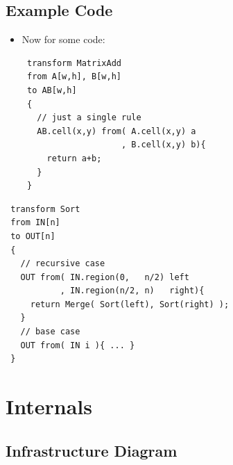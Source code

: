 \documentclass{beamer}
\begin{document}
\subsection{Example Code}

\begin{frame}[fragile]
\begin{itemize}
\item Now for some code:
{\small
\begin{verbatim}
 transform MatrixAdd
 from A[w,h], B[w,h] 
 to AB[w,h]
 {
   // just a single rule
   AB.cell(x,y) from( A.cell(x,y) a
                    , B.cell(x,y) b){
     return a+b;
   }
 }
\end{verbatim}
}
\end{itemize}
\end{frame}

\begin{frame}[fragile]
\begin{minipage}{\textwidth}
{\footnotesize
\begin{verbatim}
 transform Sort 
 from IN[n]
 to OUT[n]
 {
   // recursive case
   OUT from( IN.region(0,   n/2) left
           , IN.region(n/2, n)   right){
     return Merge( Sort(left), Sort(right) );
   }
   // base case
   OUT from( IN i ){ ... }
 }
\end{verbatim}
}
\end{minipage}
\end{frame}

\section{Internals}
\subsection{Infrastructure Diagram}
\end{document}
